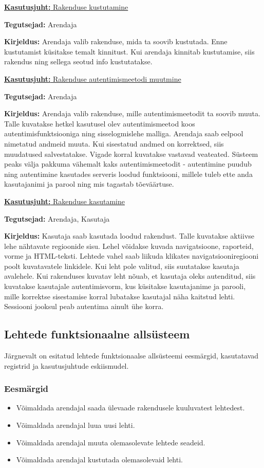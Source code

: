 \documentclass[a4paper,12pt]{article} %
\begin{document}
\underline{\textbf{Kasutusjuht:} Rakenduse kustutamine}
\par
\textbf{Tegutsejad:} Arendaja
\par
\textbf{Kirjeldus:} Arendaja valib rakenduse, mida ta soovib kustutada. Enne kustutamist küsitakse temalt kinnitust. Kui arendaja kinnitab kustutamise, siis rakendus ning sellega seotud info kustutatakse.
\par

\underline{\textbf{Kasutusjuht:} Rakenduse autentimismeetodi muutmine}
\par
\textbf{Tegutsejad:} Arendaja
\par
\textbf{Kirjeldus:} Arendaja valib rakenduse, mille autentimismeetodit ta soovib muuta. Talle kuvatakse hetkel kasutusel olev autentimismeetod koos autentimisfunktsiooniga ning sisselogmislehe malliga. Arendaja saab eelpool nimetatud andmeid muuta. Kui sisestatud andmed on korrektsed, siis muudatused salvestatakse. Vigade korral kuvatakse vastavad veateated.
Süsteem peaks välja pakkuma vähemalt kaks autentimismeetodit - autentimine puudub ning autentimine kasutades serveris loodud funktsiooni, millele tuleb ette anda kasutajanimi ja parool ning mis tagastab tõeväärtuse.
\par

\underline{\textbf{Kasutusjuht:} Rakenduse kasutamine}
\par
\textbf{Tegutsejad:} Arendaja, Kasutaja
\par
\textbf{Kirjeldus:} Kasutaja saab kasutada loodud rakendust. Talle kuvatakse aktiivse lehe nähtavate regioonide sisu. Lehel võidakse kuvada navigatsioone, raporteid, vorme ja HTML-teksti. Lehtede vahel saab liikuda klikates navigatsiooniregiooni poolt kuvatavatele linkidele. Kui leht pole valitud, siis suutatakse kasutaja avalehele. Kui rakenduses kuvatav leht nõuab, et kasutaja oleks autenditud, siis kuvatakse kasutajale autentimisvorm, kus küsitakse kasutajanime ja parooli, mille korrektse sisestamise korral lubatakse kasutajal näha kaitstud lehti. Sessiooni jooksul peab autentima ainult ühe korra.
\par

\subsection{Lehtede funktsionaalne allsüsteem}
Järgnevalt on esitatud lehtede funktsionaalse allsüsteemi eesmärgid, kasutatavad registrid ja kasutusjuhtude eskiismudel.
\subsubsection{Eesmärgid}
\begin{itemize}
\item Võimaldada arendajal saada ülevaade rakendusele kuuluvatest lehtedest.
\item Võimaldada arendajal luua uusi lehti.
\item Võimaldada arendajal muuta olemasolevate lehtede seadeid.
\item Võimaldada arendajal kustutada olemasolevaid lehti.
\end{itemize}
\end{document}
